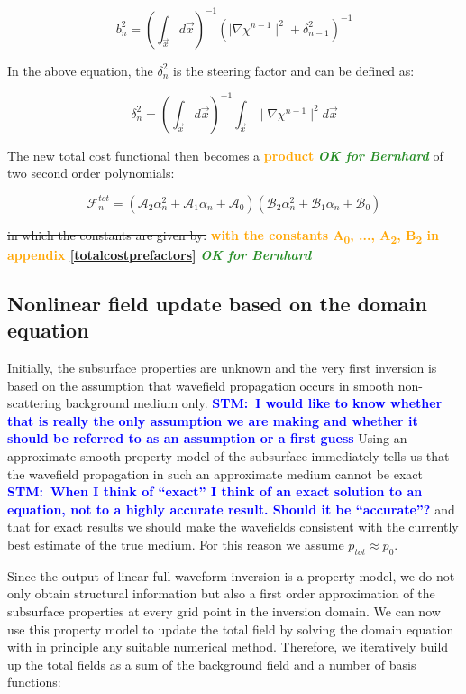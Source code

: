 \documentclass[10pt,a4paper]{article}
\newcommand{\commentstm}[1]{\textcolor{blue}{\textbf{STM:\ #1}}}
\newcommand{\newstmtwo}[1]{\textcolor{orange}{\textbf{#1}}}
\newcommand{\oldstm}[1]{\sout{#1}}
\newcommand{\oldstmtwo}[1]{\xout{#1}}
\newcommand{\brok}{\textcolor{ForestGreen}{\textit{\textbf{OK for Bernhard}}}}
\begin{document}
\begin{equation} \label{eq:eq21} b_n^{2} = (\int_{\vec{x}} d\vec{x})^{-1} (\mid\nabla\chi^{n-1}\mid^2 + \delta_{n-1}^2)^{-1} \end{equation}

In the above equation, the $\delta_{n}^2$ is the steering factor and can be defined as:

\begin{equation} \label{eq:eq22} \delta_{n}^2 = (\int_{\vec{x}} d\vec{x})^{-1} \int_{\vec{x}} \mid\nabla\chi^{n-1}\mid^2 d\vec{x} \end{equation}

The new total cost functional then becomes a \oldstmtwo{sum}\newstmtwo{product} {\brok} of two second order polynomials:

\begin{equation} \label{eq:eq23} \mathcal{F}^{tot}_n = (\mathcal{A}_2\alpha^{2}_n + \mathcal{A}_1\alpha_n +\mathcal{A}_0)(\mathcal{B}_2\alpha^{2}_n + \mathcal{B}_1\alpha_n + \mathcal{B}_0) \end{equation}

\oldstm{in which the constants are given by:}
\newstmtwo{with the constants A\textsubscript{0}, ..., A\textsubscript{2}, B\textsubscript{2} in appendix \ref{totalcostprefactors}} {\brok}

\subsection{Nonlinear field update based on the domain equation}

Initially, the subsurface properties are unknown  and the very first inversion is based on the assumption that wavefield propagation occurs in smooth non-scattering background medium only.
\commentstm{I would like to know whether that is really the only assumption we are making and whether it should be referred to as an assumption or a first guess}
Using an approximate smooth property model of the subsurface immediately tells us that the wavefield propagation in such an approximate medium cannot be exact \commentstm{When I think of ``exact'' I think of an exact solution to an equation, not to a highly accurate result. Should it be ``accurate''?} and that for exact results we should make the wavefields consistent with the currently best estimate of the true medium. For this reason we assume $p_{tot} \approx p_0$.

Since the output of linear full waveform inversion is a property model, we do
not only obtain structural information but also a first order approximation of the subsurface properties at every grid point in the inversion domain. We can now use this property model to update the total field by solving the domain equation with in principle any suitable numerical method. Therefore, we iteratively build up the total fields as a sum of the background field and a number of basis functions:
\end{document}
